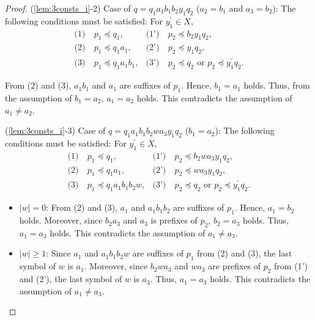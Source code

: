 \begin{proof}
\noindent
(\ref{lem:3consts_i}-2) Case of $q=q_{1}a_{1}b_{1}b_{2}y_{1}q_{2}$ ($a_{2}=b_{1}$ and $a_{3}=b_{2}$):
The following conditions must be satisfied: For $y_{1}^{\prime} \in X$,
\begin{align*}
\textrm{(1)}~& p_{1} \preceq q_{1}, & \textrm{(1')}~& p_{2} \preceq b_{2}y_{1}q_{2}, \\
\textrm{(2)}~& p_{1} \preceq q_{1}a_{1}, & \textrm{(2')}~& p_{2} \preceq y_{1}q_{2}, \\
\textrm{(3)}~& p_{1} \preceq q_{1}a_{1}b_{1}, & \textrm{(3')}~& p_{2} \preceq q_{2} \mbox{~or~} p_{2} \preceq y_{1}^{\prime}q_{2}.
\end{align*}

From (2) and (3), $a_{1}b_{1}$ and $a_{1}$ are suffixes of $p_{1}$.
Hence, $b_{1}=a_{1}$ holds.
Thus, from the assumption of $b_{1}=a_{2}$, $a_{1}=a_{2}$ holds.
This contradicts the assumption of $a_{1} \ne a_{2}$.
\smallskip

\noindent
(\ref{lem:3consts_i}-3) Case of $q=q_{1}a_{1}b_{1}b_{2}wa_{3}y_{1}q_{2}$ ($b_{1}=a_{2}$):
The following conditions must be satisfied: For $y_{1}^{\prime} \in X$,
\begin{align*}
\textrm{(1)}~& p_{1} \preceq q_{1}, & \textrm{(1')}~& p_{2} \preceq b_{2}wa_{3}y_{1}q_{2}, \\
\textrm{(2)}~& p_{1} \preceq q_{1}a_{1}, & \textrm{(2')}~& p_{2} \preceq wa_{3}y_{1}q_{2}, \\
\textrm{(3)}~& p_{1} \preceq q_{1}a_{1}b_{1}b_{2}w, & \textrm{(3')}~& p_{2} \preceq q_{2} \mbox{~or~} p_{2} \preceq y_{1}^{\prime}q_{2}.
\end{align*}

\begin{itemize}
\item $|w|=0$: From (2) and (3), $a_{1}$ and $a_{1}b_{1}b_{2}$ are suffixes of $p_{1}$.
Hence, $a_{1}=b_{2}$ holds.
Moreover, since $b_{2}a_{3}$ and $a_{3}$ is prefixes of $p_{2}$, $b_{2}=a_{3}$ holds.
Thus, $a_{1}=a_{3}$ holds.
This contradicts the assumption of $a_{1} \ne a_{3}$.
%
\item $|w| \ge 1$: Since $a_{1}$ and $a_{1}b_{1}b_{2}w$ are suffixes of $p_{1}$ from (2) and (3),
the last symbol of $w$ is $a_{1}$.
Moreover, since $b_{2}wa_{3}$ and $wa_{3}$ are prefixes of $p_{2}$ from (1') and (2'),
the last symbol of $w$ is $a_{3}$.
Thus, $a_{1}=a_{3}$ holds.
This contradicts the assumption of $a_{1} \ne a_{3}$.
\end{itemize}

\smallskip


\end{proof}
